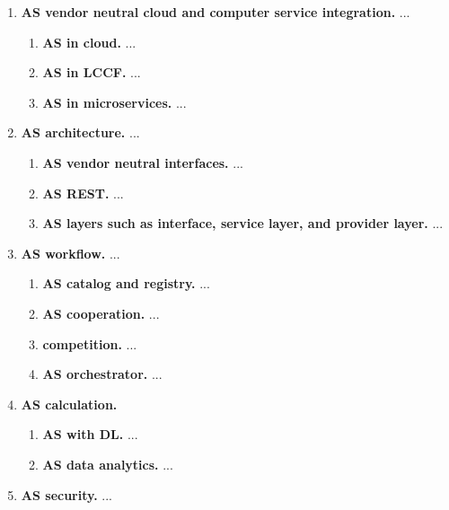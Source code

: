 \begin{enumerate}

\item{\bf AS vendor neutral cloud and computer service integration.} ...

  \begin{enumerate}
  \item {\bf AS in cloud.} ...
  \item {\bf AS in LCCF.} ...
  \item {\bf AS in microservices.} ...
  \end{enumerate}

\item{\bf AS architecture.} ...

  \begin{enumerate}
  \item{\bf AS vendor neutral interfaces.} ...
  \item{\bf AS REST.} ...
  \item{\bf AS layers such as interface, service layer, and provider layer.} ...
  \end{enumerate}

\item{\bf AS workflow.} ...

  \begin{enumerate}
  \item{\bf AS catalog and registry.} ...
  \item{\bf AS cooperation.} ...
  \item{\bf competition.} ...
  \item{\bf AS orchestrator.} ...
  \end{enumerate}


\item{\bf AS calculation.}

  \begin{enumerate}
  \item{\bf AS with DL.} ...
  \item{\bf AS data analytics.} ...
  \end{enumerate}

\item{\bf AS security.} ...

\end{enumerate}


